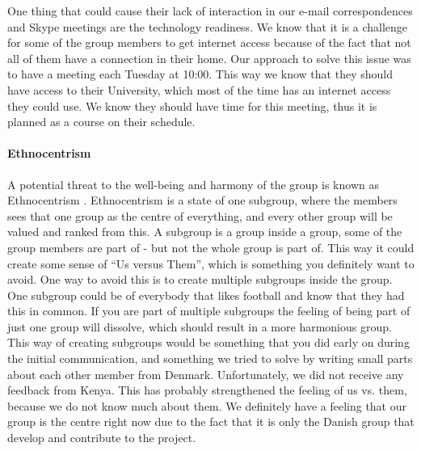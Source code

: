 One thing that could cause their lack of interaction in our e-mail correspondences and Skype meetings are the technology readiness. We know that it is a challenge for some of the group members to get internet access because of the fact that not all of them have a connection in their home. Our approach to solve this issue was to have a meeting each Tuesday at 10:00. This way we know that they should have access to their University, which most of the time has an internet access they could use. We know they should have time for this meeting, thus it is planned as a course on their schedule.

\paragraph{Ethnocentrism} \label{par:ethnocentrism}
A potential threat to the well-being and harmony of the group is known as Ethnocentrism \cite{durnell2004subgroup}. Ethnocentrism is a state of one subgroup, where the members sees that one group as the centre of everything, and every other group will be valued and ranked from this. A subgroup is a group inside a group, some of the group members are part of - but not the whole group is part of. This way it could create some sense of ``Us versus Them'', which is something you definitely want to avoid. One way to avoid this is to create multiple subgroups inside the group. One subgroup could be of everybody that likes football and know that they had this in common. If you are part of multiple subgroups the feeling of being part of just one group will dissolve, which should result in a more harmonious group.
This way of creating subgroups would be something that you did early on during the initial communication, and something we tried to solve by writing small parts about each other member from Denmark. Unfortunately, we did not receive any feedback from Kenya. This has probably strengthened the feeling of us vs. them, because we do not know much about them. We definitely have a feeling that our group is the centre right now due to the fact that it is only the Danish group that develop and contribute to the project.

